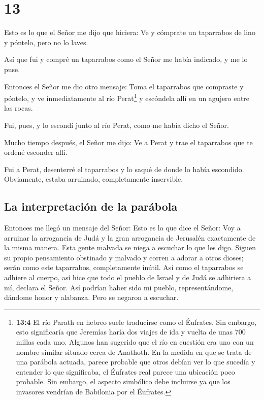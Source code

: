 \hypertarget{section-12}{%
\section{13}\label{section-12}}

 Esto es lo que el Señor me dijo que hiciera: Ve y
cómprate un taparrabos de lino y póntelo, pero no lo laves.

 Así que fui y compré un taparrabos como el Señor me había
indicado, y me lo puse.

 Entonces el Señor me dio otro mensaje: 
Toma el taparrabos que compraste y póntelo, y ve inmediatamente al río
Perat\footnote{\textbf{13:4} El río Parath en hebreo suele traducirse
  como el Éufrates. Sin embargo, esto significaría que Jeremías haría
  dos viajes de ida y vuelta de unas 700 millas cada uno. Algunos han
  sugerido que el río en cuestión era uno con un nombre similar situado
  cerca de Anathoth. En la medida en que se trata de una parábola
  actuada, parece probable que otros debían ver lo que sucedía y
  entender lo que significaba, el Éufrates real parece una ubicación
  poco probable. Sin embargo, el aspecto simbólico debe incluirse ya que
  los invasores vendrían de Babilonia por el Éufrates.} y escóndela allí
en un agujero entre las rocas.

 Fui, pues, y lo escondí junto al río Perat, como me había
dicho el Señor.

 Mucho tiempo después, el Señor me dijo: Ve a Perat y trae
el taparrabos que te ordené esconder allí.

 Fui a Perat, desenterré el taparrabos y lo saqué de donde
lo había escondido. Obviamente, estaba arruinado, completamente
inservible.

\hypertarget{la-interpretaciuxf3n-de-la-paruxe1bola}{%
\subsection{La interpretación de la
parábola}\label{la-interpretaciuxf3n-de-la-paruxe1bola}}

 Entonces me llegó un mensaje del Señor: 
Esto es lo que dice el Señor: Voy a arruinar la arrogancia de Judá y la
gran arrogancia de Jerusalén exactamente de la misma manera.
 Esta gente malvada se niega a escuchar lo que les digo.
Siguen su propio pensamiento obstinado y malvado y corren a adorar a
otros dioses; serán como este taparrabos, completamente inútil.
 Así como el taparrabos se adhiere al cuerpo, así hice
que todo el pueblo de Israel y de Judá se adhiriera a mí, declara el
Señor. Así podrían haber sido mi pueblo, representándome, dándome honor
y alabanza. Pero se negaron a escuchar.

